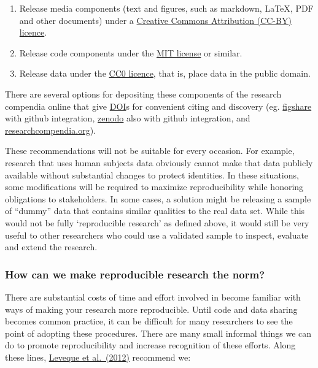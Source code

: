\documentclass[
]{book}
\providecommand{\tightlist}{%
  \setlength{\itemsep}{0pt}\setlength{\parskip}{0pt}}
\begin{document}
\begin{enumerate}
\def\labelenumi{\arabic{enumi}.}
\tightlist
\item
  Release media components (text and figures, such as markdown, LaTeX, PDF and other documents) under a \href{http://creativecommons.org/licenses/by/4.0/}{Creative Commons Attribution (CC-BY) licence}.
\item
  Release code components under the \href{http://opensource.org/licenses/MIT}{MIT license} or similar.
\item
  Release data under the \href{https://creativecommons.org/publicdomain/zero/1.0/}{CC0 licence}, that is, place data in the public domain.
\end{enumerate}

There are several options for depositing these components of the research compendia online that give \href{https://en.wikipedia.org/wiki/Digital_object_identifier}{DOI}s for convenient citing and discovery (eg. \href{http://figshare.com/}{figshare} with github integration, \href{https://zenodo.org/}{zenodo} also with github integration, and \href{http://researchcompendia.org/}{researchcompendia.org}).

These recommendations will not be suitable for every occasion. For example, research that uses human subjects data obviously cannot make that data publicly available without substantial changes to protect identities. In these situations, some modifications will be required to maximize reproducibility while honoring obligations to stakeholders. In some cases, a solution might be releasing a sample of ``dummy'' data that contains similar qualities to the real data set. While this would not be fully `reproducible research' as defined above, it would still be very useful to other researchers who could use a validated sample to inspect, evaluate and extend the research.

\hypertarget{how-can-we-make-reproducible-research-the-norm}{%
\subsubsection{How can we make reproducible research the norm?}\label{how-can-we-make-reproducible-research-the-norm}}

There are substantial costs of time and effort involved in become familiar with ways of making your research more reproducible. Until code and data sharing becomes common practice, it can be difficult for many researchers to see the point of adopting these procedures. There are many small informal things we can do to promote reproducibility and increase recognition of these efforts. Along these lines, \href{http://www.stanford.edu/~vcs/papers/CiSE2012-LMS.pdf}{Leveque et al.~(2012)} recommend we:
\end{document}
